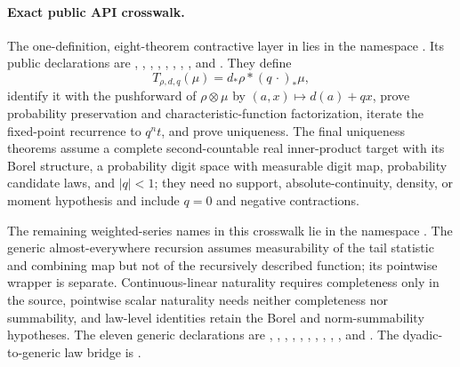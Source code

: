 \documentclass[11pt]{article}
\numberwithin{equation}{section}
\theoremstyle{definition}
\theoremstyle{remark}
\begin{document}
\paragraph{Exact public API crosswalk.}
The one-definition, eight-theorem contractive layer in
 lies in the namespace .  Its
public declarations are
,
,
,
,
,
,
,
, and
.
They define
\[
 T_{\rho,d,q}(\mu)=d_*\rho\ast(q\,\cdot)_*\mu,
\]
identify it with the pushforward of \(\rho\otimes\mu\) by
\((a,x)\mapsto d(a)+qx\), prove probability preservation and characteristic-function
factorization, iterate the fixed-point recurrence to \(q^n t\), and prove uniqueness.
The final uniqueness theorems assume a complete second-countable real inner-product target
with its Borel structure, a probability digit space with measurable digit map, probability
candidate laws, and \(|q|<1\); they need no support, absolute-continuity, density, or moment
hypothesis and include \(q=0\) and negative contractions.

The remaining weighted-series names in this crosswalk lie in the namespace
.  The generic almost-everywhere recursion assumes
measurability of the tail statistic and combining map but not of the recursively described
function; its pointwise wrapper is separate.  Continuous-linear naturality requires
completeness only in the source, pointwise scalar naturality needs neither completeness nor
summability, and law-level identities retain the Borel and norm-summability hypotheses.
The eleven generic declarations are
,
,
,
,
,
,
,
,
,
, and
.
The dyadic-to-generic law bridge is
.
\end{document}

